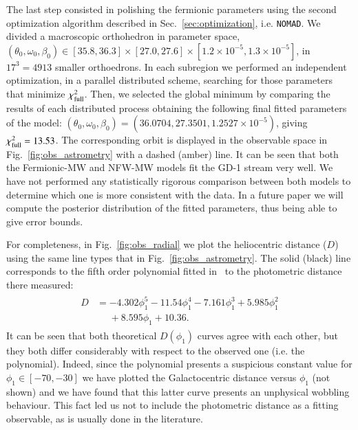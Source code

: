 \documentclass[twocolumn]{aa}
\begin{document}
The last step consisted in polishing the fermionic parameters using the second optimization algorithm described in Sec.~\ref{sec:optimization}, i.e. \texttt{NOMAD}. We divided a  macroscopic orthohedron in parameter space, $(\theta_0, \omega_0, \beta_0) \in [35.8, 36.3]\times[27.0, 27.6]\times [1.2\times10^{-5}, 1.3\times10^{-5}]$, in $17^3=4913$ smaller orthoedrons. In each subregion we performed an independent optimization, in a parallel distributed scheme, searching for those parameters that minimize $\chi^2_{\rm{full}}$. Then, we selected the global minimum by comparing the results of each distributed process obtaining the following final fitted parameters of the model: $(\theta_0, \omega_0, \beta_0)= (36.0704, 27.3501, 1.2527\times10^{-5})$, giving $\chi^2_{\rm{full}}= 13.53$.
The corresponding orbit is displayed in the observable space in
Fig.~\ref{fig:obs_astrometry} with a dashed (amber) line. It can be seen that both the Fermionic-MW and NFW-MW models fit the GD-1 stream very well.
We have not performed any statistically rigorous comparison between both models to determine which one is more consistent with the data. In a future paper we will compute the posterior distribution of the fitted parameters, thus being able to give error bounds. 


For completeness, in Fig.~\ref{fig:obs_radial} we plot the heliocentric distance ($D$) using the same line types that in Fig.~\ref{fig:obs_astrometry}. The solid (black) line corresponds to the fifth order polynomial fitted in~\cite{Ibata_2020} to the photometric distance there measured:
\begin{align}
 \label{phot_dist}
    \begin{split}
        D &= -4.302\phi_1^5 - 11.54\phi_1^4 - 7.161\phi_1^3 + 5.985\phi_1^2\\
      &\phantom{=} + 8.595\phi_1+10.36.
    \end{split}
\end{align}
It can be seen that both theoretical $D(\phi_1)$ curves agree with each other, but they both differ considerably with respect to the observed one (i.e. the polynomial). Indeed, since the polynomial presents a suspicious constant value for $\phi_1 \in [-70,-30]$ we have plotted the Galactocentric distance versus $\phi_1$ (not shown) and we have found that this latter curve presents an unphysical wobbling behaviour. This fact led us not to include the photometric distance as a fitting observable, as is usually done in the literature. 
\end{document}
